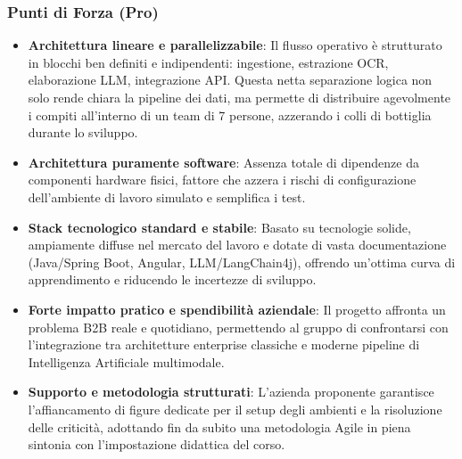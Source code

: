 \subsubsection{Punti di Forza (Pro)}
\begin{itemize}
    \item \textbf{Architettura lineare e parallelizzabile}: Il flusso operativo è strutturato in blocchi ben definiti e indipendenti: ingestione, estrazione OCR, elaborazione LLM, integrazione API. Questa netta separazione logica non solo rende chiara la pipeline dei dati, ma permette di distribuire agevolmente i compiti all'interno di un team di 7 persone, azzerando i colli di bottiglia durante lo sviluppo.
    \item \textbf{Architettura puramente software}: Assenza totale di dipendenze da componenti hardware fisici, fattore che azzera i rischi di configurazione dell'ambiente di lavoro simulato e semplifica i test.

    \item \textbf{Stack tecnologico standard e stabile}: Basato su tecnologie solide, ampiamente diffuse nel mercato del lavoro e dotate di vasta documentazione (Java/Spring Boot, Angular, LLM/LangChain4j), offrendo un'ottima curva di apprendimento e riducendo le incertezze di sviluppo.

    \item \textbf{Forte impatto pratico e spendibilità aziendale}: Il progetto affronta un problema B2B reale e quotidiano, permettendo al gruppo di confrontarsi con l'integrazione tra architetture enterprise classiche e moderne pipeline di Intelligenza Artificiale multimodale.

    \item \textbf{Supporto e metodologia strutturati}: L'azienda proponente garantisce l'affiancamento di figure dedicate per il setup degli ambienti e la risoluzione delle criticità, adottando fin da subito una metodologia Agile in piena sintonia con l'impostazione didattica del corso.
\end{itemize}
